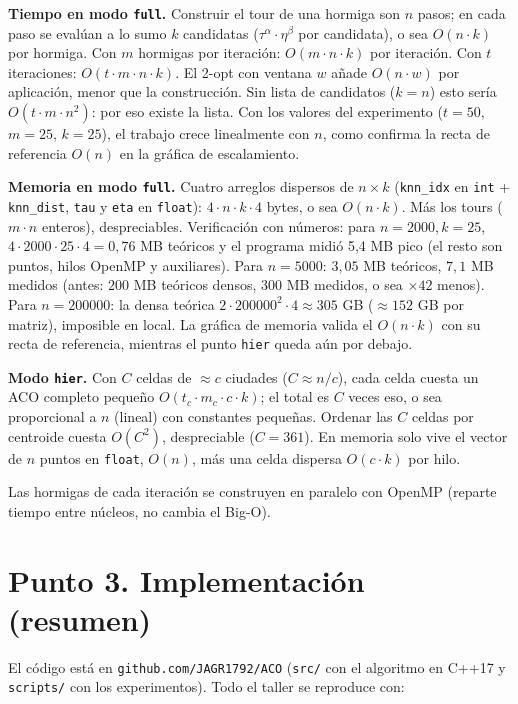 \documentclass[12pt,a4paper]{article}
\begin{document}
\textbf{Tiempo en modo \texttt{full}.} Construir el tour de una hormiga son
$n$ pasos; en cada paso se evalúan a lo sumo $k$ candidatas
($\tau^\alpha \cdot \eta^\beta$ por candidata), o sea $O(n \cdot k)$ por
hormiga. Con $m$ hormigas por iteración: $O(m \cdot n \cdot k)$ por iteración.
Con $t$ iteraciones: $O(t \cdot m \cdot n \cdot k)$. El 2-opt con ventana $w$
añade $O(n \cdot w)$ por aplicación, menor que la construcción. Sin lista de
candidatos ($k = n$) esto sería $O(t \cdot m \cdot n^2)$: por eso existe la
lista. Con los valores del experimento ($t = 50$, $m = 25$, $k = 25$), el
trabajo crece linealmente con $n$, como confirma la recta de referencia
$O(n)$ en la gráfica de escalamiento.

\textbf{Memoria en modo \texttt{full}.} Cuatro arreglos dispersos de $n \times k$
(\texttt{knn\_idx} en \texttt{int} + \texttt{knn\_dist}, \texttt{tau} y
\texttt{eta} en \texttt{float}): $4 \cdot n \cdot k \cdot 4$ bytes, o sea
$O(n \cdot k)$. Más los tours ($m \cdot n$ enteros), despreciables.
Verificación con números: para $n = 2000, k = 25$, $4 \cdot 2000 \cdot 25
\cdot 4 = 0,76$ MB teóricos y el programa midió 5,4 MB pico (el resto son
puntos, hilos OpenMP y auxiliares). Para $n = 5000$: $3,05$ MB teóricos,
$7,1$ MB medidos (antes: $200$ MB teóricos densos, $300$ MB medidos, o sea
$\times 42$ menos). Para $n = 200000$: la densa teórica
$2 \cdot 200000^2 \cdot 4 \approx 305$ GB ($\approx 152$ GB por matriz),
imposible en local. La gráfica de memoria valida el $O(n \cdot k)$ con su
recta de referencia, mientras el punto \texttt{hier} queda aún por debajo.

\textbf{Modo \texttt{hier}.} Con $C$ celdas de $\approx c$ ciudades
($C \approx n/c$), cada celda cuesta un ACO completo pequeño
$O(t_c \cdot m_c \cdot c \cdot k)$; el total es
$C$ veces eso, o sea proporcional a $n$ (lineal) con constantes pequeñas.
Ordenar las $C$ celdas por centroide cuesta $O(C^2)$, despreciable
($C = 361$). En memoria solo vive el vector de $n$ puntos en \texttt{float},
$O(n)$, más una celda dispersa $O(c \cdot k)$ por hilo.

Las hormigas de cada iteración se construyen en paralelo con OpenMP (reparte
tiempo entre núcleos, no cambia el Big-O).

\section{Punto 3. Implementación (resumen)}

El código está en \texttt{github.com/JAGR1792/ACO} (\texttt{src/} con el
algoritmo en C++17 y \texttt{scripts/} con los experimentos). Todo el taller
se reproduce con:
\end{document}
